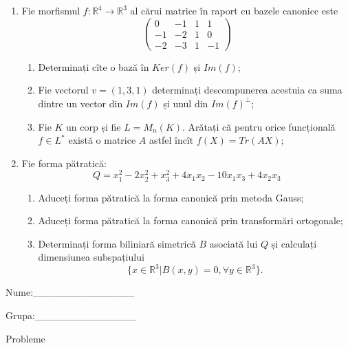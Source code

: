 \documentclass{article}
\begin{document}
\begin{enumerate}
 \item Fie morfismul $f:\mathbb{R}^4 \to \mathbb{R}^3$ al cărui matrice în raport cu bazele canonice este
$$\begin{pmatrix}
0&-1&1&1\\
-1&-2&1&0\\
-2&-3&1&-1
\end{pmatrix}$$

\begin{enumerate}
\item Determinați cîte o bază în $Ker(f)$ și $Im(f)$;
\item Fie vectorul $v=(1,3,1)$ determinați descompunerea acestuia ca suma dintre un vector din $Im(f)$ și unul din $Im(f)^\perp$;
\item Fie $K$ un corp și fie $L=M_n(K)$. Arătați că pentru orice funcțională $f \in L^*$ există o matrice $A$ astfel încît $f(X)=Tr(AX)$;
\end{enumerate}
\item Fie forma pătratică:
$$Q= x_1^2-2x_2^2+x_3^2+4x_1x_2-10x_1x_3+4x_2x_3$$

\begin{enumerate}
\item Aduceți forma pătratică la forma canonică prin metoda Gauss;
\item Aduceți forma pătratică la forma canonică prin transformări ortogonale;
\item Determinați forma biliniară simetrică $B$ asociată lui $Q$ și calculați dimensiunea subspațiului
$$\{x \in \mathbb{R}^3 | B(x,y)=0,\forall y \in \mathbb{R}^3\}.$$

\end{enumerate}
\end{enumerate}
\newpage
\begin{flushright}
Nume:\_\_\_\_\_\_\_\_\_\_\_\_\_\_
 
 
Grupa:\_\_\_\_\_\_\_\_\_\_\_\_\_\_
\end{flushright}
\begin{center}
\vspace{2cm}
{\Large Probleme}
\vspace{2cm}
\end{center}
\end{document}
